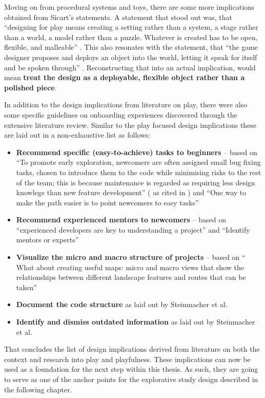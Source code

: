Moving on from procedural systems and toys, there are some more implications obtained from Sicart's statements. A statement that stood out was, that \enquote{designing for play means creating a setting rather than a system, a stage rather than a world, a model rather than a puzzle. Whatever is created has to be open, flexible, and malleable} \cite[p. 90]{sicart2014play}. This also resonates with the statement, that \enquote{the game designer proposes and deploys an object into the world, letting it speak for itself and be spoken through} \cite[p. 90]{sicart2014play}. Reconstructing that into an actual implication, would mean \textbf{treat the design as a deployable, flexible object rather than a polished piece}.

In addition to the design implications from literature on play, there were also some specific guidelines on onboarding experiences discovered through the extensive literature review. Similar to the play focused design implications these are laid out in a non-exhaustive list as follows:

\begin{itemize}
  \item{\textbf{Recommend specific (easy-to-achieve) tasks to beginners} -- based on \enquote{To promote early exploration, newcomers are often assigned small bug fixing tasks, chosen to introduce them to the code while minimising risks to the rest of the team; this is because maintenance is regarded as requiring less design knowlege than new feature development} (\cite{latoza2006maintaining} as cited in \cite[p. 36]{yates2014onboarding}) and \enquote{One way to make the path easier is to point newcomers to easy tasks} \cite[p. 8]{steinmacher2018let}}
  \item{\textbf{Recommend experienced mentors to newcomers} -- based on \enquote{experienced developers are key to understanding a project} \cite[p. 284]{dagenais2010moving} and \enquote{Identify mentors or experts} \cite[p. 9]{steinmacher2018let}}
  \item{\textbf{Visualize the micro and macro structure of projects} -- based on \enquote{ What about creating useful maps: micro and macro views that show the relationships between different landscape features and routes that can be taken} \cite[p. 284]{dagenais2010moving}}
  \item{\textbf{Document the code structure} as laid out by Steinmacher et al. \cite[p. 10]{steinmacher2018let}}
  \item{\textbf{Identify and dismiss outdated information} as laid out by Steinmacher et al. \cite[p. 10]{steinmacher2018let}}
\end{itemize}

That concludes the list of design implications derived from literature on both the context and research into play and playfulness. These implications can now be used as a foundation for the next step within this thesis. As such, they are going to serve as one of the anchor points for the explorative study design described in the following chapter.